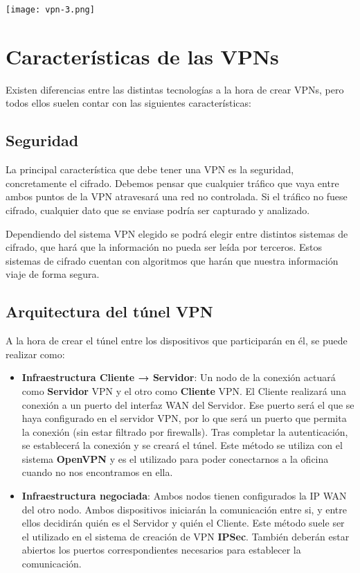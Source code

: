 \begin{center}
    \texttt{[image: vpn-3.png]}
\end{center}


\section{Características de las VPNs}
Existen diferencias entre las distintas tecnologías a la hora de crear VPNs, pero todos ellos suelen contar con las siguientes características:

\subsection{Seguridad}
La principal característica que debe tener una VPN es la seguridad, concretamente el cifrado. Debemos pensar que cualquier tráfico que vaya entre ambos puntos de la VPN atravesará una red no controlada. Si el tráfico no fuese cifrado, cualquier dato que se enviase podría ser capturado y analizado.

Dependiendo del sistema VPN elegido se podrá elegir entre distintos sistemas de cifrado, que hará que la información no pueda ser leída por terceros. Estos sistemas de cifrado cuentan con algoritmos que harán que nuestra información viaje de forma segura.


\subsection{Arquitectura del túnel VPN}
A la hora de crear el túnel entre los dispositivos que participarán en él, se puede realizar como:

\begin{itemize}
    \item \textbf{Infraestructura Cliente → Servidor}: Un nodo de la conexión actuará como \textbf{Servidor} VPN y el otro como \textbf{Cliente} VPN. El Cliente realizará una conexión a un puerto del interfaz WAN del Servidor. Ese puerto será el que se haya configurado en el servidor VPN, por lo que será un puerto que permita la conexión (sin estar filtrado por firewalls). Tras completar la autenticación, se establecerá la conexión y se creará el túnel. Este método se utiliza con el sistema \textbf{OpenVPN} y es el utilizado para poder conectarnos a la oficina cuando no nos encontramos en ella.

    \item \textbf{Infraestructura negociada}: Ambos nodos tienen configurados la IP WAN del otro nodo. Ambos dispositivos iniciarán la comunicación entre si, y entre ellos decidirán quién es el Servidor y quién el Cliente. Este método suele ser el utilizado en el sistema de creación de VPN  \textbf{IPSec}. También deberán estar abiertos los puertos correspondientes necesarios para establecer la comunicación.
\end{itemize}


